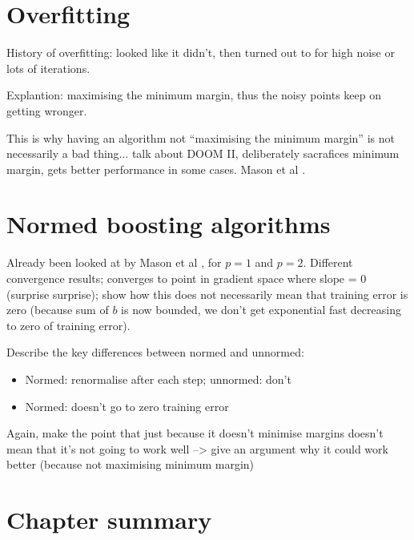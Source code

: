 \section{Overfitting}

History of overfitting: looked like it didn't, then turned out to
for high noise or lots of iterations.

Explantion: maximising the minimum margin, thus the noisy points keep
on getting wronger.

This is why having an algorithm not ``maximising the minimum margin''
is not necessarily a bad thing... talk about DOOM II, deliberately
sacrafices minimum margin, gets better performance in some cases.
Mason et al \cite{Mason99}.

\section{Normed boosting algorithms}

Already been looked at by Mason et al \cite{Mason99a}, for $p=1$ and
$p=2$.  Different convergence results; converges to point in gradient
space where slope = 0 (surprise surprise); show how this does not
necessarily mean that training error is zero (because sum of
$b$ is now bounded, we don't get exponential fast decreasing to zero
of training error).

Describe the key differences between normed and unnormed:
\begin{itemize}
\item	Normed: renormalise after each step; unnormed: don't
\item	Normed: doesn't go to zero training error
\end{itemize}

Again, make the point that just because it doesn't minimise margins
doesn't mean that it's not going to work well --> give an argument why
it could work better (because not maximising minimum margin)


\section{Chapter summary}



